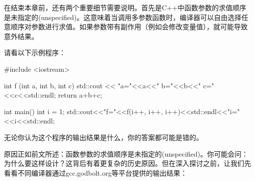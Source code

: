 
在结束本章前，还有两个重要细节需要说明。首先是C++中函数参数的求值顺序是未指定的(unspecified)。这意味着当调用多参数函数时，编译器可以自由选择任意顺序对参数进行求值。如果参数带有副作用（例如会修改变量值），就可能导致意外结果。

请看以下示例程序：

\begin{cpp}
#include <iostream>

int f (int a, int b, int c) {
  std::cout << "a="<<a<<" b="<<b<<" c="<<c<<std::endl;
  return a+b+c;
}

int main() {
  int i = 1;
  std::cout<<"f="<<f(i++, i++, i++)<<std::endl<<"i="<<i<<std::endl;
}
\end{cpp}

无论你认为这个程序的输出结果是什么，你的答案都可能是错的。

原因正如前文所述：函数参数的求值顺序是未指定的(unspecified)。你可能会问：为什么要这样设计？这背后有着更复杂的历史原因。但在深入探讨之前，让我们先看看不同编译器通过gcc.godbolt.org等平台提供的输出结果：

